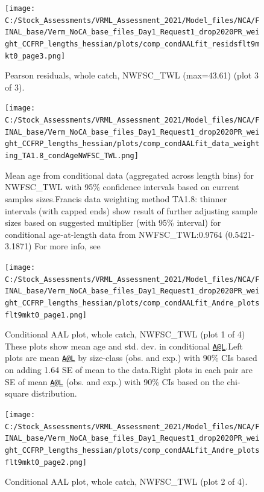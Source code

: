 \documentclass[11pt,
  english,
]{article}
\begin{document}
\begin{figure}
\centering
\texttt{[image: C:/Stock\_Assessments/VRML\_Assessment\_2021/Model\_files/NCA/FINAL\_base/Verm\_NoCA\_base\_files\_Day1\_Request1\_drop2020PR\_weight\_CCFRP\_lengths\_hessian/plots/comp\_condAALfit\_residsflt9mkt0\_page3.png]}
\caption{Pearson residuals, whole catch, NWFSC\_TWL (max=43.61) (plot 3 of 3).\label{fig:comp_condAALfit_residsflt9mkt0_page3}}
\end{figure}

\begin{figure}
\centering
\texttt{[image: C:/Stock\_Assessments/VRML\_Assessment\_2021/Model\_files/NCA/FINAL\_base/Verm\_NoCA\_base\_files\_Day1\_Request1\_drop2020PR\_weight\_CCFRP\_lengths\_hessian/plots/comp\_condAALfit\_data\_weighting\_TA1.8\_condAgeNWFSC\_TWL.png]}
\caption{Mean age from conditional data (aggregated across length bins) for NWFSC\_TWL with 95\% confidence intervals based on current samples sizes.Francis data weighting method TA1.8: thinner intervals (with capped ends) show result of further adjusting sample sizes based on suggested multiplier (with 95\% interval) for conditional age-at-length data from NWFSC\_TWL:0.9764 (0.5421-3.1871) For more info, see}
\end{figure}

\begin{figure}
\centering
\texttt{[image: C:/Stock\_Assessments/VRML\_Assessment\_2021/Model\_files/NCA/FINAL\_base/Verm\_NoCA\_base\_files\_Day1\_Request1\_drop2020PR\_weight\_CCFRP\_lengths\_hessian/plots/comp\_condAALfit\_Andre\_plotsflt9mkt0\_page1.png]}
\caption{Conditional AAL plot, whole catch, NWFSC\_TWL (plot 1 of 4) These plots show mean age and std. dev. in conditional {\href{mailto:A@L}{\nolinkurl{A@L}}\leavevmode\tagmcend\tagstructend}.Left plots are mean {\href{mailto:A@L}{\nolinkurl{A@L}}\leavevmode\tagmcend\tagstructend} by size-class (obs. and exp.) with 90\% CIs based on adding 1.64 SE of mean to the data.Right plots in each pair are SE of mean {\href{mailto:A@L}{\nolinkurl{A@L}}\leavevmode\tagmcend\tagstructend} (obs. and exp.) with 90\% CIs based on the chi-square distribution.\label{fig:comp_condAALfit_Andre_plotsflt9mkt0_page1}}
\end{figure}

\begin{figure}
\centering
\texttt{[image: C:/Stock\_Assessments/VRML\_Assessment\_2021/Model\_files/NCA/FINAL\_base/Verm\_NoCA\_base\_files\_Day1\_Request1\_drop2020PR\_weight\_CCFRP\_lengths\_hessian/plots/comp\_condAALfit\_Andre\_plotsflt9mkt0\_page2.png]}
\caption{Conditional AAL plot, whole catch, NWFSC\_TWL (plot 2 of 4).\label{fig:comp_condAALfit_Andre_plotsflt9mkt0_page2}}
\end{figure}
\end{document}
